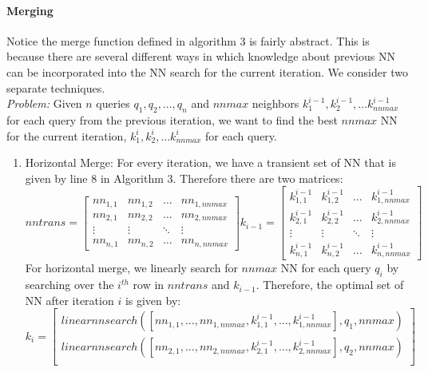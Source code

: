 \documentclass[11pt]{article}
\begin{document}
\paragraph{Merging} Notice the merge function defined in algorithm 3 is fairly abstract. This is because there are several different ways in which knowledge about previous NN can be incorporated into the NN search for the current iteration. We consider two separate techniques. 
\\
\emph{Problem:} Given $n$ queries $q_1,q_2,...,q_n$ and $nnmax$ neighbors $k^{i-1}_1,k^{i-1}_2,...k^{i-1}_{nnmax}$ for each query from the previous iteration, we want to find the best $nnmax$ NN for the current iteration, $k^{i}_1,k^{i}_2,...k^{i}_{nnmax}$ for each query. 
\begin{enumerate}
\item Horizontal Merge: For every iteration, we have a transient set of NN that is given by line 8 in Algorithm 3. Therefore there are two matrices:
\begin{equation}
nntrans = 
\begin{bmatrix}
nn_{1,1} & nn_{1,2} & \dots & nn_{1,nnmax} \\
nn_{2,1} & nn_{2,2} & \dots & nn_{2,nnmax} \\
\vdots   & \vdots   & \ddots & \vdots \\
nn_{n,1} & nn_{n,2} & \dots & nn_{n,nnmax}
\end{bmatrix}
k_{i-1} =
\begin{bmatrix}
k^{i-1}_{1,1} & k^{i-1}_{1,2} & \dots & k^{i-1}_{1,nnmax} \\
k^{i-1}_{2,1} & k^{i-1}_{2,2} & \dots & k^{i-1}_{2,nnmax} \\
\vdots   & \vdots   & \ddots & \vdots \\
k^{i-1}_{n,1} & k^{i-1}_{n,2} & \dots & k^{i-1}_{n,nnmax}
\end{bmatrix}
\end{equation}
For horizontal merge, we linearly search for $nnmax$ NN for each query $q_i$ by searching over the $i^{th
}$ row in $nntrans$ and $k_{i-1}$. Therefore, the optimal set of NN after iteration $i$ is given by:
\begin{equation}
k_i = 
\begin{bmatrix}
linearnnsearch([nn_{1,1},\dots, nn_{1,nnmax}, k^{i-1}_{1,1},\dots, k^{i-1}_{1,nnmax}],q_1,nnmax) \\
linearnnsearch([nn_{2,1},\dots, nn_{2,nnmax}, k^{i-1}_{2,1},\dots, k^{i-1}_{2,nnmax}],q_2,nnmax) \\

\end{bmatrix}
\end{equation}
\end{enumerate}
\end{document}
